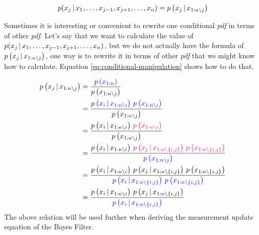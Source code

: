 \documentclass[12pt]{article}
\begin{document}
\begin{equation}
p(x_j \,|\, x_1, \dots, x_{j-1}, x_{j+1}, \dots, x_n) = p\left(x_j \,|\, x_{1:n \setminus j}\right)    
\end{equation}

Sometimes it is interesting or convenient to rewrite one conditional \textit{pdf} in terms of other \textit{pdf}. Let's say that we want to calculate the value of $p(x_j \,|\, x_1, \dots, x_{j-1}, x_{j+1}, \dots, x_n)$, but we do not actually have the formula of $p\left(x_j \,|\, x_{1:n \setminus j}\right)$, one way is to rewrite it in terms of other \textit{pdf} that we might know how to calculate. Equation \ref{eq:conditional-manipulation} shows how to do that.

\begin{equation}
    \begin{aligned}
        p\left(x_j \,|\, x_{1:n \setminus j}\right) &= \dfrac{\color{blue}p\left(x_{1:n}\right)}{ p\left(x_{1:n \setminus j}\right) }\\
        &= \dfrac{\color{blue} p\left(x_i \,|\, x_{1:n \setminus i} \right) \, p\left(x_{1:n \setminus i} \right) }{p\left(x_{1:n \setminus j}\right) } \\
        &= \dfrac{p\left(x_i \,|\, x_{1:n \setminus i} \right) \, \color{magenta} p\left(x_{1:n \setminus i} \right) }{p\left(x_{1:n \setminus j}\right) } \\
        &= \dfrac{p\left(x_i \,|\, x_{1:n \setminus i} \right)\,\color{magenta} p\left(x_j \,|\, x_{1:n \setminus \left\{i, j\right\}} \right) \, p\left(x_{1:n \setminus \left\{i, j\right\}}\right) }{\color{blue} p\left(x_{1:n \setminus j}\right)}\\
        &= \dfrac{p\left(x_i \,|\, x_{1:n \setminus i} \right)\,p\left(x_j \,|\, x_{1:n \setminus \left\{i, j\right\}} \right) \, p\left(x_{1:n \setminus \left\{i, j\right\}}\right) }{\color{blue} p\left(x_i \,|\, x_{1:n \setminus \left\{i, j\right\}}\right) \, p\left(x_{1:n \setminus \left\{i, j\right\}}\right) }\\
        &= \dfrac{p\left(x_i \,|\, x_{1:n \setminus i} \right)\,p\left(x_j \,|\, x_{1:n \setminus \left\{i, j\right\}} \right) }{\color{blue} p\left(x_i \,|\, x_{1:n \setminus \left\{i, j\right\}}\right) }
    \end{aligned}
    \label{eq:conditional-manipulation}
\end{equation}
The above relation will be used further when deriving the measurement update equation of the Bayes Filter.
\end{document}
